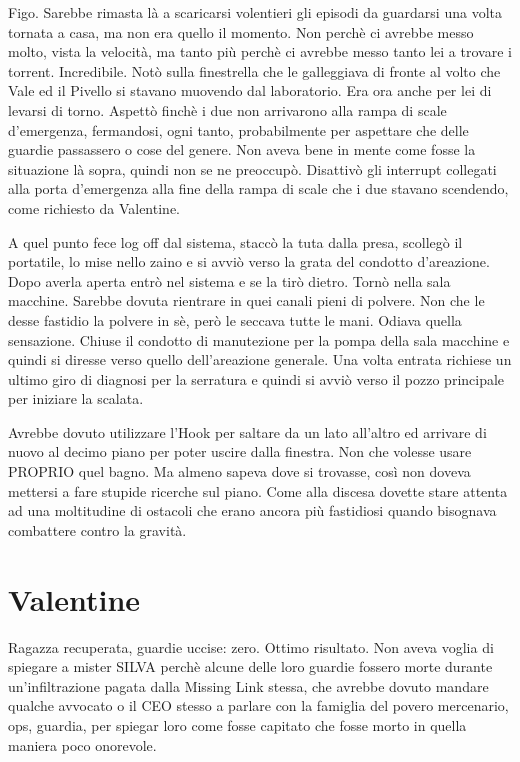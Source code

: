     Figo. Sarebbe rimasta là a scaricarsi volentieri gli episodi da guardarsi una volta tornata a casa, ma non era
    quello il momento. Non perchè ci avrebbe messo molto, vista la velocità, ma tanto più perchè ci avrebbe messo tanto
    lei a trovare i torrent. Incredibile. Notò sulla finestrella che le galleggiava di fronte al volto che Vale ed il
    Pivello si stavano muovendo dal laboratorio. Era ora anche per lei di levarsi di torno. Aspettò finchè i due non
    arrivarono alla rampa di scale d'emergenza, fermandosi, ogni tanto, probabilmente per aspettare che delle guardie
    passassero o cose del genere. Non aveva bene in mente come fosse la situazione là sopra, quindi non se ne preoccupò.
    Disattivò gli interrupt collegati alla porta d'emergenza alla fine della rampa di scale che i due stavano scendendo,
    come richiesto da Valentine.
    
    A quel punto fece log off dal sistema, staccò la tuta dalla presa, scollegò il portatile, lo mise nello zaino e si avviò verso la grata del condotto
    d'areazione. Dopo averla aperta entrò nel sistema e se la tirò dietro. Tornò nella sala macchine. Sarebbe dovuta
    rientrare in quei canali pieni di polvere. Non che le desse fastidio la polvere in sè, però le seccava tutte le
    mani. Odiava quella sensazione. Chiuse il condotto di manutezione per la pompa della sala macchine e quindi si
    diresse verso quello dell'areazione generale. Una volta entrata richiese un ultimo giro di diagnosi per la serratura
    e quindi si avviò verso il pozzo principale per iniziare la scalata.

    Avrebbe dovuto utilizzare l'Hook per saltare da un lato all'altro ed arrivare di nuovo al decimo piano per poter
    uscire dalla finestra. Non che volesse usare PROPRIO quel bagno. Ma almeno sapeva dove si trovasse, così non doveva
    mettersi a fare stupide ricerche sul piano. Come alla discesa dovette stare attenta ad una moltitudine di ostacoli
    che erano ancora più fastidiosi quando bisognava combattere contro la gravità.
    
  \section*{Valentine}

    Ragazza recuperata, guardie uccise: zero. Ottimo risultato. Non aveva voglia di spiegare a mister SILVA perchè
    alcune delle loro guardie fossero morte durante un'infiltrazione pagata dalla Missing Link stessa, che avrebbe
    dovuto mandare qualche avvocato o il CEO stesso a parlare con la famiglia del povero mercenario, ops, guardia, per
    spiegar loro come fosse capitato che fosse morto in quella maniera poco onorevole.

